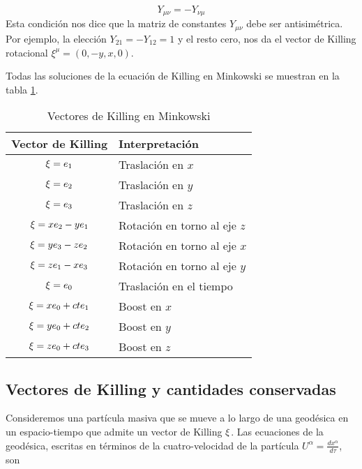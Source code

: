 \begin{equation}
    Y_{\mu \nu}=-Y_{\nu \mu}
\end{equation}
Esta condición nos dice que la matriz de constantes $Y_{\mu \nu}$ debe ser antisimétrica. Por ejemplo, la elección $Y_{21}=-Y_{12}=1$ y el resto cero, nos da el vector de Killing rotacional $\xi^\mu=(0,-y, x, 0)$.

Todas las soluciones de la ecuación de Killing en Minkowski se muestran en la tabla \ref{tab:killingMinkowski}.

\begin{table}[H]
    \centering
    \caption{Vectores de Killing en Minkowski}

    \begin{tabular}{c|l}
        \hline
        \textbf{Vector de Killing} & \textbf{Interpretación}      \\ \hline
        $\mathbf{\xi}=e_1$              & Traslación en $x$            \\ \hline
        $\mathbf{\xi}=e_2$              & Traslación en $y$            \\ \hline
        $\mathbf{\xi}=e_3$              & Traslación en $z$            \\ \hline
        $\mathbf{\xi}=x e_2-y e_1$      & Rotación en torno al eje $z$ \\ \hline
        $\mathbf{\xi}=y e_3-z e_2$      & Rotación en torno al eje $x$ \\ \hline
        $\mathbf{\xi}=z e_1-x e_3$      & Rotación en torno al eje $y$ \\ \hline
        $\mathbf{\xi}=e_0$              & Traslación en el tiempo      \\ \hline
        $\mathbf{\xi}=x e_0+c t e_1$    & Boost en $x$                 \\ \hline
        $\mathbf{\xi}=y e_0+c t e_2$    & Boost en $y$                 \\ \hline
        $\mathbf{\xi}=z e_0+c t e_3$    & Boost en $z$                 \\ \hline
    \end{tabular}
    \label{tab:killingMinkowski}
\end{table}

\subsection{Vectores de Killing y cantidades conservadas}
Consideremos una partícula masiva que se mueve a lo largo de una geodésica en un espacio-tiempo que admite un vector de Killing $\mathbf{\xi}$. Las ecuaciones de la geodésica, escritas en términos de la cuatro-velocidad de la partícula $U^\alpha=\frac{d x^\alpha}{d \tau}$, son

